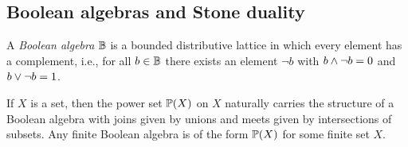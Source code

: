 \documentclass{amsart}
\begin{document}
    \subsection{Boolean algebras and Stone duality}
    \begin{Def}
        A \emph{Boolean algebra} $\mathbb{B}$ is a bounded distributive lattice in which every element has a complement, i.e., for all $b \in \mathbb{B}$ there exists an element $\neg b$ with $b \land \neg b = 0$ and $b \lor \neg b = 1$. 
    \end{Def}
    
    \begin{Exa}\label{exa:powerBA}
        If $X$ is a set, then the power set $\mathbb{P}(X)$ on $X$ naturally carries the structure of a Boolean algebra with joins given by unions and meets given by intersections of subsets. Any finite Boolean algebra is of the form $\mathbb{P}(X)$ for some finite set $X$.
    \end{Exa}
    
\end{document}
